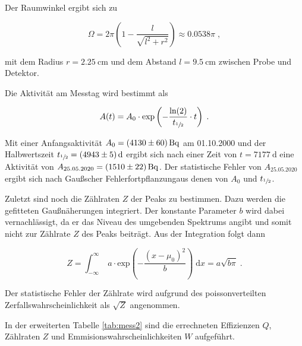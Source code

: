 Der Raumwinkel ergibt sich zu 

\begin{equation}
  \Omega = 2 \pi \left(1 - \frac{l}{\sqrt{l^2 + r^2}}\right) \approx \num{0.0538} \pi \; ,
\end{equation} 

mit dem Radius $r = \SI{2.25}{\centi\meter}$ und dem Abstand $l = \SI{9.5}{\centi\meter}$ zwischen Probe und Detektor.

Die Aktivität am Messtag wird bestimmt als

\begin{equation}
  A(t) = A_0 \cdot \text{exp} \left(- \frac{\text{ln}(2)}{t_{\sfrac{1}{2}}} \cdot t \right)  \; .
\end{equation}

Mit einer Anfangsaktivität $A_0 = \SI{4130 +- 60}{\becquerel}$ am 01.10.2000 und der Halbwertszeit
$t_{\sfrac{1}{2}} = \SI{4943 +- 5}{\day}$ ergibt sich nach einer Zeit von $t = \SI{7177}{\day}$
eine Aktivität von $A_{25.05.2020} = \SI{1510 +- 22}{\becquerel}$.
Der statistische Fehler von $A_{25.05.2020}$ ergibt sich nach 
Gaußscher Fehlerfortpflanzungaus denen von $A_0$ und $t_{\sfrac{1}{2}}$.

Zuletzt sind noch die Zählraten $Z$ der Peaks zu bestimmen. Dazu werden die gefitteten Gaußnäherungen integriert. 
Der konstante Parameter $b$ wird dabei vernachlässigt, da er das Niveau des umgebenden Spektrums angibt und somit nicht zur 
Zählrate $Z$ des Peaks beiträgt. Aus der Integration folgt dann

\begin{equation}
  Z = \int_{-\infty}^\infty \; a \cdot \text{exp}\left( - \frac{(x-\mu_0)^2}{b}\right) \; \text{d}x = a \sqrt{b\pi} \; .
\end{equation}

Der statistische Fehler der Zählrate wird aufgrund des poissonverteilten Zerfallswahrscheinlichkeit als $\sqrt{Z}$ angenommen.

In der erweiterten Tabelle \ref{tab:mess2} sind die errechneten Effizienzen $Q$, Zählraten $Z$ und 
Emmisionswahrscheinlichkeiten $W$ aufgeführt.

